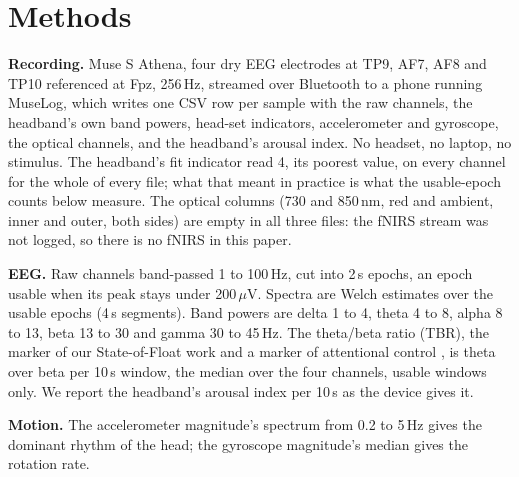 \documentclass[conference]{IEEEtran}
\begin{document}
\section{Methods}

\textbf{Recording.} Muse S Athena, four dry EEG electrodes at TP9, AF7, AF8 and TP10 referenced at Fpz, 256\,Hz, streamed over Bluetooth to a phone running MuseLog, which writes one CSV row per sample with the raw channels, the headband's own band powers, head-set indicators, accelerometer and gyroscope, the optical channels, and the headband's arousal index. No headset, no laptop, no stimulus. The headband's fit indicator read 4, its poorest value, on every channel for the whole of every file; what that meant in practice is what the usable-epoch counts below measure. The optical columns (730 and 850\,nm, red and ambient, inner and outer, both sides) are empty in all three files: the fNIRS stream was not logged, so there is no fNIRS in this paper.

\textbf{EEG.} Raw channels band-passed 1 to 100\,Hz, cut into 2\,s epochs, an epoch usable when its peak stays under 200\,$\mu$V. Spectra are Welch estimates over the usable epochs (4\,s segments). Band powers are delta 1 to 4, theta 4 to 8, alpha 8 to 13, beta 13 to 30 and gamma 30 to 45\,Hz. The theta/beta ratio (TBR), the marker of our State-of-Float work and a marker of attentional control \cite{putman2010tbr, angelidis2016tbr}, is theta over beta per 10\,s window, the median over the four channels, usable windows only. We report the headband's arousal index per 10\,s as the device gives it.

\textbf{Motion.} The accelerometer magnitude's spectrum from 0.2 to 5\,Hz gives the dominant rhythm of the head; the gyroscope magnitude's median gives the rotation rate.

\begin{table}[t]
\caption{The three modes and what each recording gave. Usable epochs are 2\,s epochs under 200\,$\mu$V on the ear channels (TP9, TP10) and on AF7. TBR is the median theta/beta ratio over 10\,s windows. Rhythm is the accelerometer's dominant frequency.}
\label{tab:modes}
\centering
\scriptsize
\setlength{\tabcolsep}{4pt}
\end{table}
\end{document}
